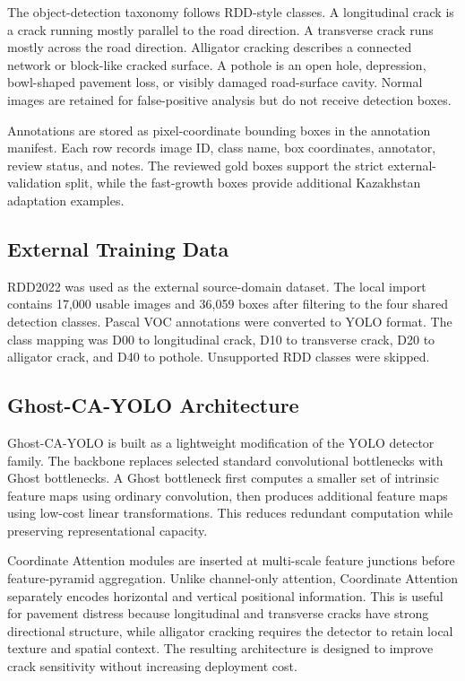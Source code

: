 \documentclass[applsci,article,submit,moreauthors]{Definitions/mdpi}
\begin{document}
The object-detection taxonomy follows RDD-style classes. A longitudinal crack is a crack running mostly parallel to the road direction. A transverse crack runs mostly across the road direction. Alligator cracking describes a connected network or block-like cracked surface. A pothole is an open hole, depression, bowl-shaped pavement loss, or visibly damaged road-surface cavity. Normal images are retained for false-positive analysis but do not receive detection boxes.

Annotations are stored as pixel-coordinate bounding boxes in the annotation manifest. Each row records image ID, class name, box coordinates, annotator, review status, and notes. The reviewed gold boxes support the strict external-validation split, while the fast-growth boxes provide additional Kazakhstan adaptation examples.

\subsection{External Training Data}

RDD2022 was used as the external source-domain dataset. The local import contains 17,000 usable images and 36,059 boxes after filtering to the four shared detection classes. Pascal VOC annotations were converted to YOLO format. The class mapping was D00 to longitudinal crack, D10 to transverse crack, D20 to alligator crack, and D40 to pothole. Unsupported RDD classes were skipped.

\subsection{Ghost-CA-YOLO Architecture}

Ghost-CA-YOLO is built as a lightweight modification of the YOLO detector family. The backbone replaces selected standard convolutional bottlenecks with Ghost bottlenecks. A Ghost bottleneck first computes a smaller set of intrinsic feature maps using ordinary convolution, then produces additional feature maps using low-cost linear transformations. This reduces redundant computation while preserving representational capacity.

Coordinate Attention modules are inserted at multi-scale feature junctions before feature-pyramid aggregation. Unlike channel-only attention, Coordinate Attention separately encodes horizontal and vertical positional information. This is useful for pavement distress because longitudinal and transverse cracks have strong directional structure, while alligator cracking requires the detector to retain local texture and spatial context. The resulting architecture is designed to improve crack sensitivity without increasing deployment cost.
\end{document}
